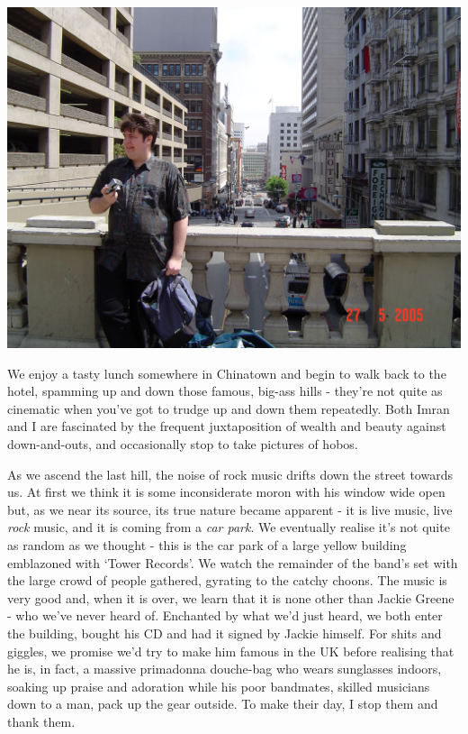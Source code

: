 \documentclass[a5paper,titlepage,11pt,draft]{book}
\begin{document}
\begin{center}\includegraphics[width=\textwidth]{gfx/DSC00625}\end{center}

We enjoy a tasty lunch somewhere in Chinatown and begin to walk back to the hotel, spamming up and down those famous, big-ass hills - they're not quite as cinematic when you've got to trudge up and down them repeatedly.  Both Imran and I are fascinated by the frequent juxtaposition of wealth and beauty against down-and-outs, and occasionally stop to take pictures of hobos.

As we ascend the last hill, the noise of rock music drifts down the street towards us.  At first we think it is some inconsiderate moron with his window wide open but, as we near its source, its true nature became apparent - it is live music, live \emph{rock} music, and it is coming from a \emph{car park}.  We eventually realise it's not quite as random as we thought - this is the car park of a large yellow building emblazoned with `Tower Records'.  We watch the remainder of the band's set with the large crowd of people gathered, gyrating to the catchy choons.  The music is very good and, when it is over, we learn that it is none other than Jackie Greene - who we've never heard of.  Enchanted by what we'd just heard, we both enter the building, bought his CD and had it signed by Jackie himself.  For shits and giggles, we promise we'd try to make him famous in the UK before realising that he is, in fact, a massive primadonna douche-bag who wears sunglasses indoors, soaking up praise and adoration while his poor bandmates, skilled musicians down to a man, pack up the gear outside.  To make their day, I stop them and thank them.
\end{document}
